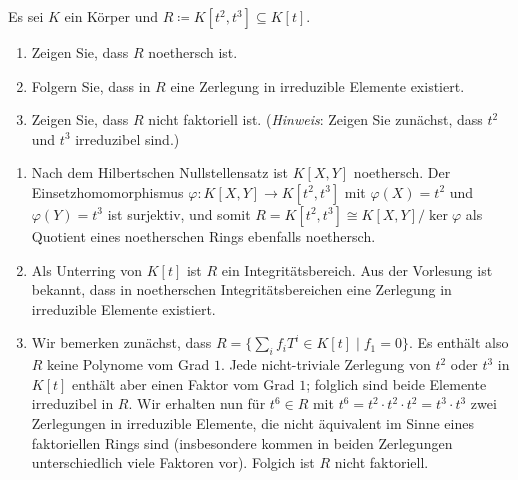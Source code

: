 \begin{question}
  Es sei $K$ ein Körper und $R \coloneqq K[t^2, t^3] \subseteq K[t]$.
  \begin{enumerate}
    \item
      Zeigen Sie, dass $R$ noethersch ist.
    \item
      Folgern Sie, dass in $R$ eine Zerlegung in irreduzible Elemente existiert.
    \item
      Zeigen Sie, dass $R$ nicht faktoriell ist.
      (\emph{Hinweis}:
       Zeigen Sie zunächst, dass $t^2$ und $t^3$ irreduzibel sind.)
  \end{enumerate}
\end{question}


\begin{solution}
  \begin{enumerate}
    \item
      Nach dem Hilbertschen Nullstellensatz ist $K[X,Y]$ noethersch.
      Der Einsetzhomomorphismus $\varphi \colon K[X,Y] \to K[t^2, t^3]$ mit $\varphi(X) = t^2$ und $\varphi(Y) = t^3$ ist surjektiv, und somit $R = K[t^2, t^3] \cong K[X,Y]/\ker \varphi$ als Quotient eines noetherschen Rings ebenfalls noethersch.
    \item
      Als Unterring von $K[t]$ ist $R$ ein Integritätsbereich.
      Aus der Vorlesung ist bekannt, dass in noetherschen Integritätsbereichen eine Zerlegung in irreduzible Elemente existiert.
    \item
      Wir bemerken zunächst, dass $R = \{\sum_i f_i T^i \in K[t] \mid f_1 = 0\}$.
      Es enthält also $R$ keine Polynome vom Grad $1$.
      Jede nicht-triviale Zerlegung von $t^2$ oder $t^3$ in $K[t]$ enthält aber einen Faktor vom Grad $1$;
      folglich sind beide Elemente irreduzibel in $R$.
      Wir erhalten nun für $t^6 \in R$ mit $t^6 = t^2 \cdot t^2 \cdot t^2 = t^3 \cdot t^3$ zwei Zerlegungen in irreduzible Elemente, die nicht äquivalent im Sinne eines faktoriellen Rings sind (insbesondere kommen in beiden Zerlegungen unterschiedlich viele Faktoren vor).
      Folgich ist $R$ nicht faktoriell.
  \end{enumerate}
\end{solution}


